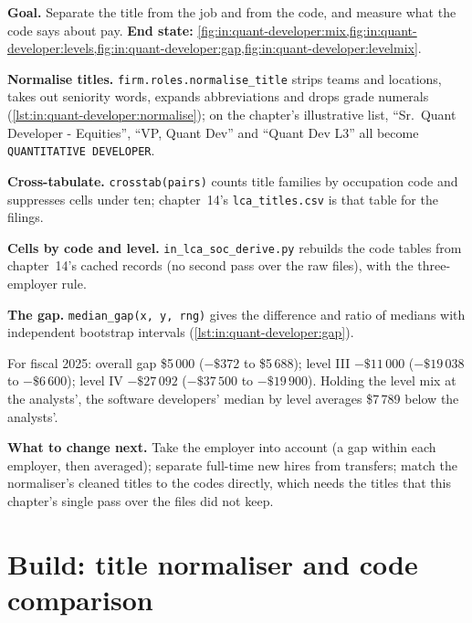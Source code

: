 \begin{tutorial}
\textbf{Goal.} Separate the title from the job and from the code, and measure what the code says about pay.
\textbf{End state:} \cref{fig:in:quant-developer:mix,fig:in:quant-developer:levels,fig:in:quant-developer:gap,fig:in:quant-developer:levelmix}.
\begin{tutsteps}
\item \textbf{Normalise titles.} \texttt{firm.roles.normalise\_title} strips teams and locations, takes out seniority
words, expands abbreviations and drops grade numerals (\cref{lst:in:quant-developer:normalise}); on the chapter's
illustrative list, ``Sr.\ Quant Developer - Equities'', ``VP, Quant Dev'' and ``Quant Dev L3'' all become
\texttt{QUANTITATIVE DEVELOPER}.
\label{lst:in:quant-developer:normalise}
\item \textbf{Cross-tabulate.} \texttt{crosstab(pairs)} counts title families by occupation code and suppresses cells under
ten; chapter~14's \texttt{lca\_titles.csv} is that table for the filings.
\item \textbf{Cells by code and level.} \texttt{in\_lca\_soc\_derive.py} rebuilds the code tables from chapter~14's cached
records (no second pass over the raw files), with the three-employer rule.
\item \textbf{The gap.} \texttt{median\_gap(x, y, rng)} gives the difference and ratio of medians with independent
bootstrap intervals (\cref{lst:in:quant-developer:gap}).
\label{lst:in:quant-developer:gap}
\end{tutsteps}
\end{tutorial}

For fiscal 2025: overall gap \$5\,000 ($-\$372$ to \$5\,688); level III $-\$11\,000$ ($-\$19\,038$ to $-\$6\,600$); level
IV $-\$27\,092$ ($-\$37\,500$ to $-\$19\,900$). Holding the level mix at the analysts', the software developers' median by
level averages \$7\,789 below the analysts'.

\textbf{What to change next.} Take the employer into account (a gap within each employer, then averaged); separate
full-time new hires from transfers; match the normaliser's cleaned titles to the codes directly, which needs the titles
that this chapter's single pass over the files did not keep.

\section{Build: title normaliser and code comparison}\label{bld:in:quant-developer:roles}

